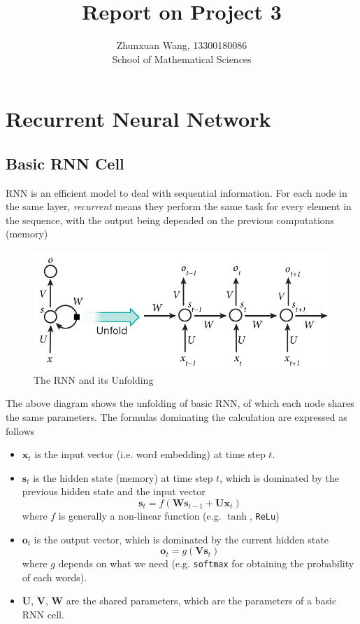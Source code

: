 \documentclass[10pt]{article}
\begin{document}
 
 
\title{\textbf{Report on Project 3}}%
\author{Zhunxuan Wang, 13300180086\\ %
School of Mathematical Sciences} %

\maketitle
\section{Recurrent Neural Network}
\subsection{Basic RNN Cell}
RNN is an efficient model to deal with sequential information. For each node in the same layer, \textit{recurrent} means they perform the same task for every element in the sequence, with the output being depended on the previous computations (memory) \cite{lecun2015deep}
\begin{figure}[H]
\centering
\includegraphics[scale=.5]{rnn.jpg}
\caption{The RNN and its Unfolding}
\label{rnn}
\end{figure}
The above diagram shows the unfolding of basic RNN, of which each node shares the same parameters. The formulas dominating the calculation are expressed as follows
\begin{itemize}
\item $\mathbf{x}_t$ is the input vector (i.e. word embedding) at time step $t$.
\item $\mathbf{s}_t$ is the hidden state (memory) at time step $t$, which is dominated by the previous hidden state and the input vector
$$\mathbf{s}_t = f\left(\mathbf{W}\mathbf{s}_{t-1} + \mathbf{U}\mathbf{x}_t\right)$$
where $f$ is generally a non-linear function (e.g. $\tanh$, \texttt{ReLu})
\item $\mathbf{o}_t$ is the output vector, which is dominated by the current hidden state
$$\mathbf{o}_t = g\left(\mathbf{V}\mathbf{s}_t\right)$$
where $g$ depends on what we need (e.g. \texttt{softmax} for obtaining the probability of each words).
\item $\mathbf{U}$, $\mathbf{V}$, $\mathbf{W}$ are the shared parameters, which are the parameters of a basic RNN cell.
\end{itemize}
\end{document}
